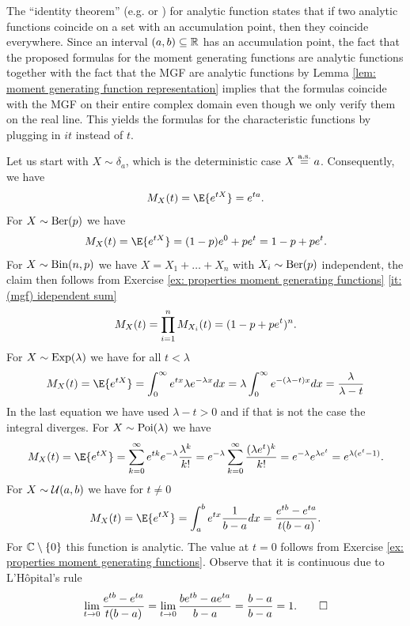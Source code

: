 \begin{solution}
    The ``identity theorem'' (e.g. \citep[Satz 12, Section 3.5]{janichFunktionentheorie2004} or \citep[Corollary 1.2.7]{krantzPrimerRealAnalytic2002}) for analytic function states that if two analytic functions
    coincide on a set with an accumulation point, then they coincide everywhere.
    Since an interval \((a,b)\subseteq \mathbb{R}\) has an accumulation point, the
    fact that the proposed formulas for the moment generating functions are analytic functions
    together with the fact that the MGF are analytic functions by Lemma
    \ref{lem: moment generating function representation} implies that the formulas
    coincide with the MGF on their entire complex domain even though we only verify
    them on the real line. This yields the formulas for the characteristic functions
    by plugging in \(i t\) instead of \(t\).

    Let us start with \(X\sim \delta_a\), which is the deterministic case \(X\overset{\operatorname{\text{a.s.}}}=a\).
    Consequently, we have
    \[
        \MGF_X(t) = \E{e^{t X}} = e^{t a}.
    \]
    For \(X\sim \mathrm{Ber}(p)\) we have
    \[
        \MGF_X(t) = \E{e^{t X}} = (1-p) e^0 + p e^t = 1 - p + p e^t.
    \]
    For \(X\sim \mathrm{Bin}(n, p)\) we have \(X = X_1 + \dots + X_n\) with
    \(X_i \sim \mathrm{Ber}(p)\) independent, the claim then follows from Exercise
    \ref{ex: properties moment generating functions} \ref{it: (mgf) idependent
    sum}
    \[
        M_X(t) = \prod_{i=1}^n M_{X_i}(t) = (1 - p + p e^t)^n.
    \]
    For \(X \sim \mathrm{Exp}(\lambda)\) we have
    for all \(t < \lambda\)
    \[
        \MGF_X(t) = \E{e^{t X}} = \int_0^\infty e^{t x} \lambda e^{-\lambda x} dx
        = \lambda \int_0^\infty e^{-(\lambda - t) x} dx
        = \frac{\lambda}{\lambda - t}
    \]
    In the last equation we have used \(\lambda -t > 0\) and if that is not the
    case the integral diverges.
    For \(X \sim \mathrm{Poi}(\lambda)\) we have
    \[
        \MGF_X(t) = \E{e^{t X}} = \sum_{k=0}^\infty e^{t k} e^{-\lambda} \frac{\lambda^k}{k!}
        = e^{-\lambda} \sum_{k=0}^\infty \frac{(\lambda e^t)^k}{k!}
        = e^{-\lambda} e^{\lambda e^t}
        = e^{\lambda (e^t - 1)}.
    \]
    For \(X \sim \mathcal{U}(a, b)\) we have for \(t\neq 0\)
    \[
        \MGF_X(t) = \E{e^{t X}} = \int_a^b e^{t x} \frac{1}{b - a} dx
        = \frac{e^{t b} - e^{t a}}{t (b - a)}.
    \]
    For \(\mathbb{C}\setminus\{0\}\) this function is analytic.
    The value at \(t=0\) follows from Exercise \ref{ex: properties moment generating functions}.
    Observe that it is continuous due to L'Hôpital's rule
    \[
        \lim_{t\to 0} \frac{e^{t b} - e^{t a}}{t (b - a)}
        = \lim_{t\to 0} \frac{b e^{t b} - a e^{t a}}{b - a}
        = \frac{b - a}{b - a} = 1.
        \qedhere
    \]
\end{solution}
